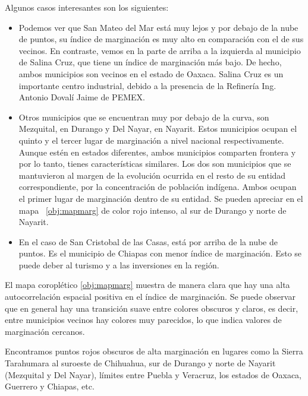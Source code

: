 Algunos casos interesantes son los siguientes:
\begin{itemize}
\item Podemos ver que San Mateo del Mar está muy lejos y por debajo de la nube de puntos, su índice de marginación es muy alto en comparación con el de sus vecinos. En contraste, vemos en la parte de arriba a la izquierda al municipio de Salina Cruz, que tiene un índice de marginación más bajo. De hecho, ambos municipios son vecinos en el estado de Oaxaca. Salina Cruz es un importante centro industrial, debido a la presencia de la Refinería Ing. Antonio Dovalí Jaime de PEMEX.

\item Otros municipios que se encuentran muy por debajo de la curva, son Mezquital, en Durango y Del Nayar, en Nayarit. Estos municipios ocupan el quinto y el tercer lugar de marginación a nivel nacional respectivamente. Aunque estén en estados diferentes, ambos municipios comparten frontera y por lo tanto, tienes características similares. Los dos son municipios que se mantuvieron al margen de la evolución ocurrida en el resto de su entidad correspondiente, por la concentración de población indígena. Ambos ocupan el primer lugar de marginación dentro de su entidad. Se pueden apreciar en el mapa ~\ref{obj:mapmarg} de color rojo intenso, al sur de Durango y norte de Nayarit.

\item En el caso de San Cristobal de las Casas, está por arriba de la nube de puntos. Es el municipio de Chiapas con menor índice de marginación. Esto se puede deber al turismo y a las inversiones en la región. 
\end{itemize}

El mapa coroplético \ref{obj:mapmarg} muestra de manera clara que hay una alta autocorrelación espacial positiva en el índice de marginación. Se puede observar que en general hay una transición suave entre colores obscuros y claros, es decir, entre municipios vecinos hay colores muy parecidos, lo que indica valores de marginación cercanos.  

Encontramos puntos rojos obscuros de alta marginación en lugares como la Sierra Tarahumara al suroeste de Chihuahua, sur de Durango y norte de Nayarit (Mezquital y Del Nayar), límites entre Puebla y Veracruz,  los estados de Oaxaca, Guerrero y Chiapas, etc.

